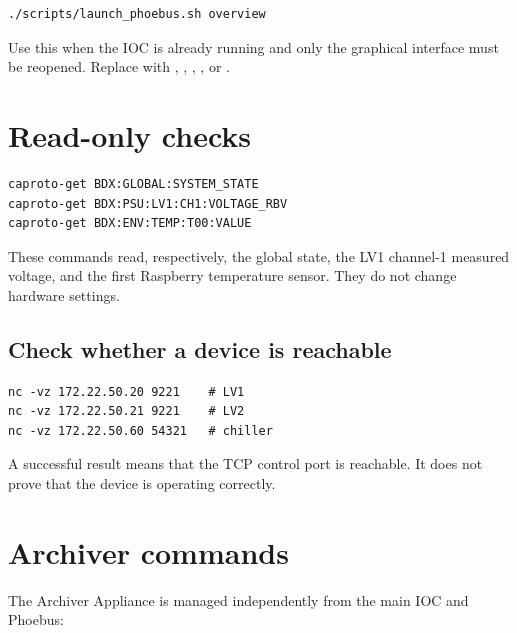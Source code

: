 \documentclass[11pt]{article}
\begin{document}
\begin{lstlisting}[style=shell]
./scripts/launch_phoebus.sh overview
\end{lstlisting}

Use this when the IOC is already running and only the graphical interface must be reopened. Replace  with , , , , or .

\section{Read-only checks}

\begin{lstlisting}[style=shell]
caproto-get BDX:GLOBAL:SYSTEM_STATE
caproto-get BDX:PSU:LV1:CH1:VOLTAGE_RBV
caproto-get BDX:ENV:TEMP:T00:VALUE
\end{lstlisting}

These commands read, respectively, the global state, the LV1 channel-1 measured voltage, and the first Raspberry temperature sensor. They do not change hardware settings.

\subsection{Check whether a device is reachable}

\begin{lstlisting}[style=shell]
nc -vz 172.22.50.20 9221    # LV1
nc -vz 172.22.50.21 9221    # LV2
nc -vz 172.22.50.60 54321   # chiller
\end{lstlisting}

A successful result means that the TCP control port is reachable. It does not prove that the device is operating correctly.

\section{Archiver commands}

The Archiver Appliance is managed independently from the main IOC and Phoebus:
\end{document}

